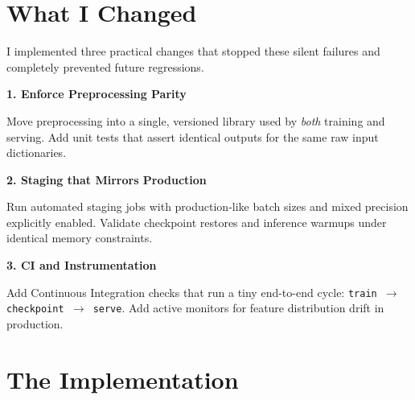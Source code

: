 \documentclass[11pt]{article}
\begin{document}
\vfill
\newpage


\section*{What I Changed}

\vspace{0.1in}

I implemented three practical changes that stopped these silent failures and completely prevented future regressions.

\vspace{0.15in}

\begin{darkbox}
\textbf{1. Enforce Preprocessing Parity}

Move preprocessing into a single, versioned library used by \textit{both} training and serving. Add unit tests that assert identical outputs for the same raw input dictionaries.
\end{darkbox}

\vspace{0.15in}

\begin{darkbox}
\textbf{2. Staging that Mirrors Production}

Run automated staging jobs with production-like batch sizes and mixed precision explicitly enabled. Validate checkpoint restores and inference warmups under identical memory constraints.
\end{darkbox}

\vspace{0.15in}

\begin{darkbox}
\textbf{3. CI and Instrumentation}

Add Continuous Integration checks that run a tiny end-to-end cycle: \texttt{train $\rightarrow$ checkpoint $\rightarrow$ serve}. Add active monitors for feature distribution drift in production.
\end{darkbox}


\vfill
\newpage


\section*{The Implementation}
\end{document}
